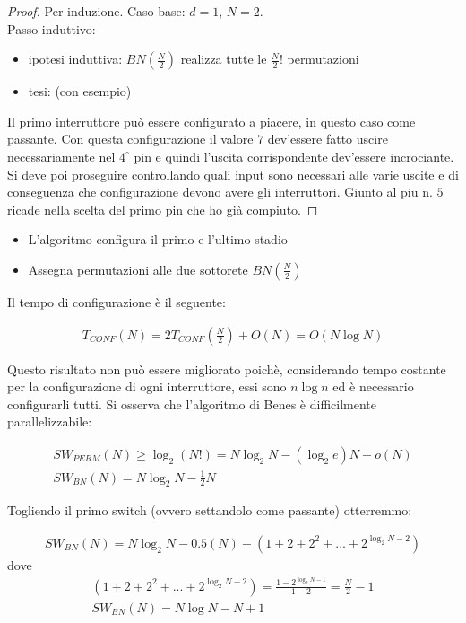 \documentclass[a4paper,portrait,12pt]{article}
\theoremstyle{definition}
\begin{document}
\begin{proof}
Per induzione. Caso base: $d = 1$, $N = 2$.\\
Passo induttivo:
\begin{itemize}
\item ipotesi induttiva: $BN(\frac{N}{2})$ realizza tutte le $\frac{N}{2}!$ permutazioni
\item tesi: (con esempio)
\end{itemize}
Il primo interruttore può essere configurato a piacere, in questo caso come passante.
Con questa configurazione il valore $7$ dev’essere fatto uscire necessariamente nel $4^{\circ}$ pin e quindi l’uscita corrispondente dev’essere incrociante.
Si deve poi proseguire controllando quali input sono necessari alle varie uscite e di conseguenza che configurazione devono avere gli interruttori.
Giunto al piu n. $5$ ricade nella scelta del primo pin che ho già compiuto. 
\end{proof}

\begin{itemize}
\item L'algoritmo configura il primo e l'ultimo stadio
\item Assegna permutazioni alle due sottorete $BN(\frac{N}{2})$
\end{itemize}

Il tempo di configurazione è il seguente:

\begin{gather*}
T_{CONF}(N) = 2 T_{CONF}\left(\frac{N}{2}\right) + O(N) = O(N\log N)
\end{gather*}

Questo risultato non può essere migliorato poichè, considerando tempo costante per la configurazione di ogni interruttore, essi sono $n\log n$ ed è necessario configurarli tutti.
Si osserva che l’algoritmo di Benes è difficilmente parallelizzabile:

\begin{gather*}
SW_{PERM}(N) \ge \log_2(N!) = N \log_2 N - (\log_2 e) N + o(N)\\
SW_{BN}(N) = N \log_2 N - \frac{1}{2}N
\end{gather*}

Togliendo il primo switch (ovvero settandolo come passante) otterremmo:

\begin{gather*}
SW_{BN}(N) = N \log_2 N - 0.5(N) - \left(1+2+2^2+...+2^{\log_2 N - 2}\right)
\end{gather*}
dove
\begin{gather*}
\left(1+2+2^2+...+2^{\log_2 N - 2}\right) = \frac{1-2^{\log_2N - 1}}{1-2} = \frac{N}{2} - 1\\
SW_{BN} (N) = N\log N - N + 1
\end{gather*}
\end{document}
